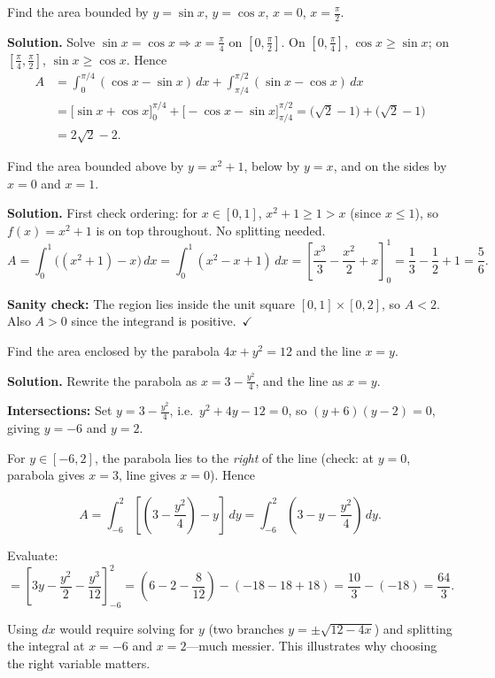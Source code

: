 \begin{examplebox}[title={Worked Example (Lecture Example 2.2): $y=\sin x$ vs.\ $y=\cos x$ on $[0,\tfrac{\pi}{2}]$}]
Find the area bounded by $y=\sin x$, $y=\cos x$, $x=0$, $x=\frac{\pi}{2}$.

\textbf{Solution.}
Solve $\sin x=\cos x\Rightarrow x=\frac{\pi}{4}$ on $[0,\frac{\pi}{2}]$.
On $[0,\frac{\pi}{4}]$, $\cos x\ge \sin x$; on $[\frac{\pi}{4},\frac{\pi}{2}]$, $\sin x\ge \cos x$. Hence
\begin{align*}
A
&=\int_{0}^{\pi/4}(\cos x-\sin x)\,dx+\int_{\pi/4}^{\pi/2}(\sin x-\cos x)\,dx\\
&=\bigl[\sin x+\cos x\bigr]_{0}^{\pi/4}+\bigl[-\cos x-\sin x\bigr]_{\pi/4}^{\pi/2}
= \bigl(\sqrt2-1\bigr)+\bigl(\sqrt2-1\bigr)\\
&=2\sqrt2-2.
\end{align*}
\end{examplebox}

\begin{examplebox}[title={Worked Example (Lecture Example 2.1): $y=x^2+1$ vs.\ $y=x$ on $[0,1]$}]
Find the area bounded above by $y=x^2+1$, below by $y=x$, and on the sides by $x=0$ and $x=1$.

\textbf{Solution.}
First check ordering: for $x\in[0,1]$, $x^2+1\ge 1> x$ (since $x\le 1$), so $f(x)=x^2+1$ is on top throughout. No splitting needed.
\[
A=\int_0^1 \bigl((x^2+1)-x\bigr)\,dx
=\int_0^1 (x^2-x+1)\,dx
=\left[\frac{x^3}{3}-\frac{x^2}{2}+x\right]_0^1
=\frac{1}{3}-\frac{1}{2}+1=\frac{5}{6}.
\]

\textbf{Sanity check:} The region lies inside the unit square $[0,1]\times[0,2]$, so $A<2$. Also $A>0$ since the integrand is positive.\ $\checkmark$
\end{examplebox}

\begin{examplebox}[title={Worked Example: Horizontal slices ($dy$) are simpler (Tutorial 3, Q3(b) style)}]
Find the area enclosed by the parabola $4x+y^2=12$ and the line $x=y$.

\textbf{Solution.}
Rewrite the parabola as $x=3-\tfrac{y^2}{4}$, and the line as $x=y$.

\textbf{Intersections:} Set $y=3-\tfrac{y^2}{4}$, i.e.\ $y^2+4y-12=0$, so $(y+6)(y-2)=0$, giving $y=-6$ and $y=2$.

For $y\in[-6,2]$, the parabola lies to the \emph{right} of the line (check: at $y=0$, parabola gives $x=3$, line gives $x=0$). Hence

\[
A=\int_{-6}^{2}\left[\left(3-\frac{y^2}{4}\right)-y\right]\,dy
=\int_{-6}^{2}\left(3-y-\frac{y^2}{4}\right)\,dy.
\]

Evaluate:
\[
=\left[3y-\frac{y^2}{2}-\frac{y^3}{12}\right]_{-6}^{2}
=\left(6-2-\frac{8}{12}\right)-\left(-18-18+18\right)
=\frac{10}{3}-(-18)=\frac{64}{3}.
\]

Using $dx$ would require solving for $y$ (two branches $y=\pm\sqrt{12-4x}$) and splitting the integral at $x=-6$ and $x=2$---much messier. This illustrates why choosing the right variable matters.
\end{examplebox}

